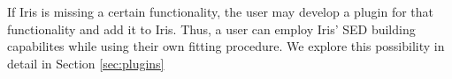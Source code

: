 If Iris is missing a certain functionality, the user may develop a plugin for that functionality and add it to Iris. Thus, a user can employ Iris' SED building capabilites while using their own fitting procedure. We explore this possibility in detail in Section \ref{sec:plugins}


%
